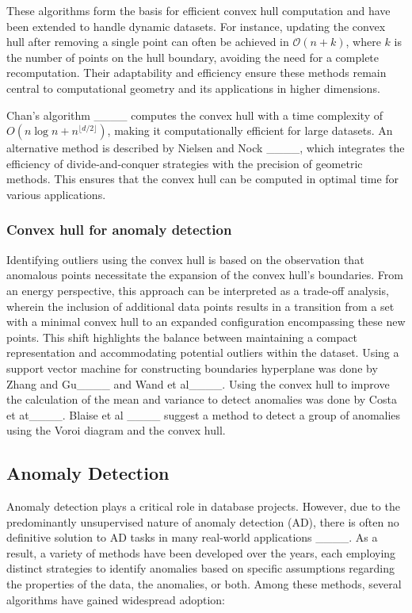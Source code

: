 These algorithms form the basis for efficient convex hull computation and have been extended to handle dynamic datasets. For instance, updating the convex hull after removing a single point can often be achieved in \(\mathcal{O}(n + k)\), where \(k\) is the number of points on the hull boundary, avoiding the need for a complete recomputation. Their adaptability and efficiency ensure these methods remain central to computational geometry and its applications in higher dimensions.

Chan's algorithm ____ computes the convex hull with a time complexity of \( O(n \log n + n^{\lfloor d/2 \rfloor}) \), making it computationally efficient for large datasets. An alternative method is described by Nielsen and Nock ____, which integrates the efficiency of divide-and-conquer strategies with the precision of geometric methods. This ensures that the convex hull can be computed in optimal time for various applications.

\subsubsection{Convex hull for anomaly detection}
Identifying outliers using the convex hull is based on the observation that anomalous points necessitate the expansion of the convex hull's boundaries. From an energy perspective, this approach can be interpreted as a trade-off analysis, wherein the inclusion of additional data points results in a transition from a set with a minimal convex hull to an expanded configuration encompassing these new points. This shift highlights the balance between maintaining a compact representation and accommodating potential outliers within the dataset.
Using a support vector machine for constructing boundaries hyperplane was done by Zhang and Gu____ and Wand et al____. Using the convex hull to improve the calculation of the mean and variance to detect anomalies was done by Costa et at____. Blaise et al ____ suggest a method to detect a group of anomalies using the Voroi diagram and the convex hull. 

\subsection{Anomaly Detection}
\label{sec:rw_anomaly_detection}
Anomaly detection plays a critical role in database projects. However, due to the predominantly unsupervised nature of anomaly detection (AD), there is often no definitive solution to AD tasks in many real-world applications ____. As a result, a variety of methods have been developed over the years, each employing distinct strategies to identify anomalies based on specific assumptions regarding the properties of the data, the anomalies, or both. Among these methods, several algorithms have gained widespread adoption:


